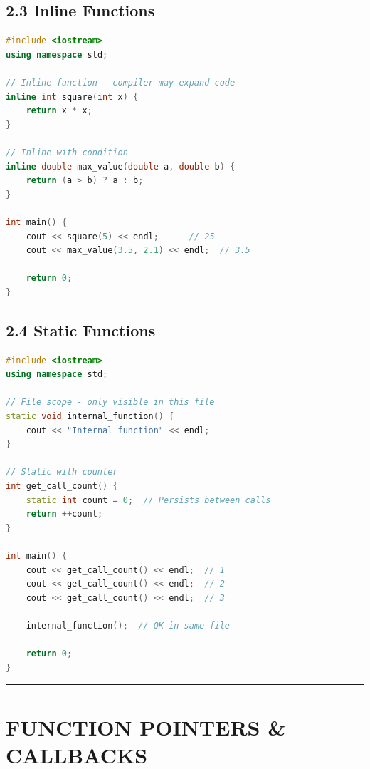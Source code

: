 \hypertarget{inline-functions}{%
\section{2.3 Inline Functions}\label{inline-functions}}

\begin{lstlisting}[language={C++}]
#include <iostream>
using namespace std;

// Inline function - compiler may expand code
inline int square(int x) {
    return x * x;
}

// Inline with condition
inline double max_value(double a, double b) {
    return (a > b) ? a : b;
}

int main() {
    cout << square(5) << endl;      // 25
    cout << max_value(3.5, 2.1) << endl;  // 3.5
    
    return 0;
}
\end{lstlisting}

\hypertarget{static-functions}{%
\section{2.4 Static Functions}\label{static-functions}}

\begin{lstlisting}[language={C++}]
#include <iostream>
using namespace std;

// File scope - only visible in this file
static void internal_function() {
    cout << "Internal function" << endl;
}

// Static with counter
int get_call_count() {
    static int count = 0;  // Persists between calls
    return ++count;
}

int main() {
    cout << get_call_count() << endl;  // 1
    cout << get_call_count() << endl;  // 2
    cout << get_call_count() << endl;  // 3
    
    internal_function();  // OK in same file
    
    return 0;
}
\end{lstlisting}

\begin{center}\rule{0.5\linewidth}{0.5pt}\end{center}

\hypertarget{function-pointers-callbacks}{%
\chapter{FUNCTION POINTERS \&
CALLBACKS}\label{function-pointers-callbacks}}

